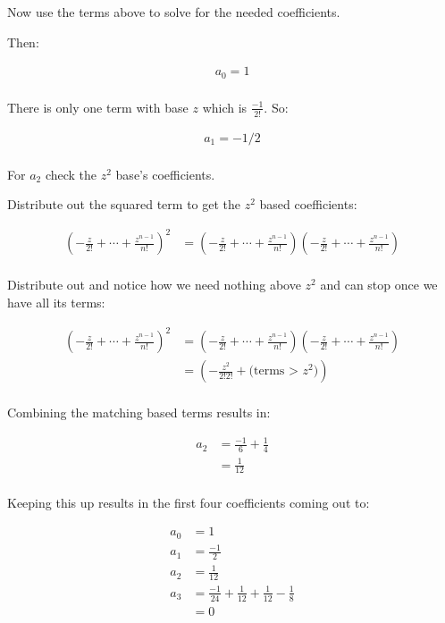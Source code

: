 \begin{enumerate}
    Now use the terms above to solve for the needed coefficients. 
    
    Then:

    \begin{align*}
      a_0 = 1 \\
    \end{align*} 
    
    There is only one term with base $z$ which is $\frac{-1}{2!}$. So:

    \begin{align*}
      a_1 = -1/2 \\
    \end{align*}

    For $a_2$ check the $z^2$ base's coefficients.

    Distribute out the squared term to get the $z^2$ based coefficients:

    \begin{align*}
      \left( - \frac{z}{2!} + \cdots + \frac{z^{n - 1}}{n!} \right)^2 &= \left( - \frac{z}{2!} + \cdots + \frac{z^{n - 1}}{n!} \right)
      \left( - \frac{z}{2!} + \cdots + \frac{z^{n - 1}}{n!} \right)  \\
    \end{align*}

    Distribute out and notice how we need nothing above $z^2$ and can stop once we have all its terms:

    \begin{align*}
      \left( - \frac{z}{2!} + \cdots + \frac{z^{n - 1}}{n!} \right)^2 &= \left( - \frac{z}{2!} + \cdots + \frac{z^{n - 1}}{n!} \right)
      \left( - \frac{z}{2!} + \cdots + \frac{z^{n - 1}}{n!} \right)  \\
      &= \left( - \frac{z^2}{2!2!} + \text{(terms > $z^2$)} \right) \\
    \end{align*}

    Combining the matching based terms results in:
    
    \begin{align*}
      a_2 &= \frac{-1}{6} + \frac{1}{4} \\
      &= \frac{1}{12} \\
    \end{align*}

    Keeping this up results in the first four coefficients coming out to:

    \begin{align*}
      a_0 &= 1 \\
      a_1 &= \frac{-1}{2} \\
      a_2 &= \frac{1}{12}  \\
      a_3 & = \frac{-1}{24} + \frac{1}{12} + \frac{1}{12} - \frac{1}{8} \\
      &= 0 \\
    \end{align*}


\end{enumerate}
